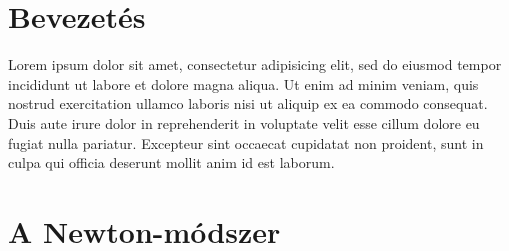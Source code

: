 \documentclass[a4paper,12pt]{report}
\begin{document}



	\chapter{Bevezetés}
		Lorem ipsum dolor sit amet, consectetur adipisicing elit, sed do eiusmod tempor incididunt ut labore et dolore magna aliqua. Ut enim ad minim veniam, quis nostrud exercitation ullamco laboris nisi ut aliquip ex ea commodo consequat. Duis aute irure dolor in reprehenderit in voluptate velit esse cillum dolore eu fugiat nulla pariatur. Excepteur sint occaecat cupidatat non proident, sunt in culpa qui officia deserunt mollit anim id est laborum.
	
	
	\chapter{A Newton-módszer}
    
    
        
        
\end{document}
